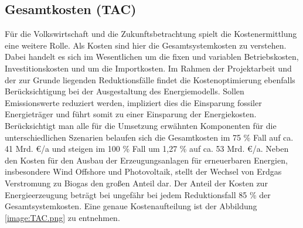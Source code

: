 \subsection{Gesamtkosten (TAC)}
Für die Volkswirtschaft und die Zukunftsbetrachtung spielt die Kostenermittlung eine weitere Rolle. Als Kosten sind hier die Gesamtsystemkosten zu verstehen. Dabei handelt es sich im Wesentlichen um die fixen und variablen Betriebskosten, Investitionskosten und um die Importkosten. Im Rahmen der Projektarbeit und der zur Grunde liegenden Reduktionsfälle findet die Kostenoptimierung ebenfalls Berücksichtigung bei der Ausgestaltung des Energiemodells. Sollen Emissionswerte reduziert werden, impliziert dies die Einsparung fossiler Energieträger und führt somit zu einer Einsparung der Energiekosten. Berücksichtigt man alle für die Umsetzung erwähnten Komponenten für die unterschiedlichen Szenarien belaufen sich die Gesamtkosten im 75 \% Fall auf ca. 41 Mrd. €/a und steigen im 100 \% Fall um 1,27 \% auf ca. 53 Mrd. €/a. Neben den Kosten für den Ausbau der Erzeugungsanlagen für erneuerbaren Energien, insbesondere Wind Offshore und Photovoltaik, stellt der Wechsel von Erdgas Verstromung zu Biogas den großen Anteil dar. Der Anteil der Kosten zur Energieerzeugung beträgt bei ungefähr bei jedem Reduktionsfall 85 \% der Gesamtsystemkosten. Eine genaue Kostenaufteilung ist der Abbildung \ref{image:TAC.png} zu entnehmen. 

